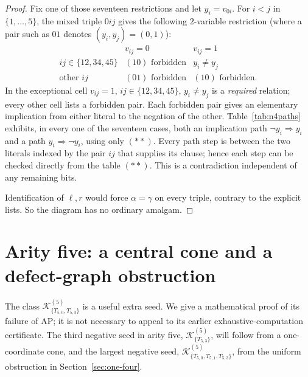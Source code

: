 \documentclass[11pt,a4paper]{article}
\theoremstyle{remark}
\newcommand{\K}{\mathcal K}
\begin{document}
\begin{proof}
Fix one of those seventeen restrictions and let $y_i=v_{0i}$.
For $i<j$ in $\{1,\ldots,5\}$, the mixed triple $0ij$ gives the
following $2$-variable restriction (where a pair such as $01$
denotes $(y_i,y_j)=(0,1)$):
\[
\begin{array}{c|cc}
 &v_{ij}=0&v_{ij}=1\\\hline
 ij\in\{12,34,45\}&(10)\text{ forbidden}&y_i\ne y_j\\
 \text{other }ij &(01)\text{ forbidden}&(10)\text{ forbidden}.
\end{array}\tag{**}
\]
In the exceptional cell $v_{ij}=1$, $ij\in\{12,34,45\}$,
$y_i\ne y_j$ is a \emph{required} relation; every other cell
lists a forbidden pair. Each forbidden pair gives an elementary
implication from either literal to the negation of the other.  Table~\ref{tab:n4paths}
exhibits, in every one of the seventeen cases, both an implication
path $\neg y_i\Rightarrow y_i$ and a path
$y_i\Rightarrow\neg y_i$, using only $(**)$.  Every path step is
between the two literals indexed by the pair $ij$ that supplies its
clause; hence each step can be checked directly from the table $(**)$.
This is a contradiction independent of any remaining bits.

Identification of $\ell,r$ would force $\alpha=\gamma$ on every
triple, contrary to the explicit lists.  So the diagram has no
ordinary amalgam.
\end{proof}

\section{Arity five: a central cone and a defect-graph obstruction}
\label{sec:arity5}
The class $\K^{(5)}_{\{T_{5,0},T_{5,3}\}}$ is a useful extra
seed.  We give a mathematical proof of its failure of AP; it is not
necessary to appeal to its earlier exhaustive-computation certificate.
The third negative seed in arity five, $\K^{(5)}_{\{T_{5,3}\}}$,
will follow from a one-coordinate cone, and the largest negative seed,
$\K^{(5)}_{\{T_{5,0},T_{5,1},T_{5,3}\}}$, from the uniform
obstruction in Section~\ref{sec:one-four}.
\end{document}
